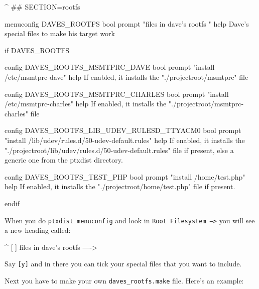 \begin{ptxshell}[escapechar=|]{^}
## SECTION=rootfs

menuconfig DAVES_ROOTFS
	bool
	prompt "files in dave's rootfs        "
	help
	  Dave's special files to make his target work

if DAVES_ROOTFS

config DAVES_ROOTFS_MSMTPRC_DAVE
	bool
	prompt "install /etc/msmtprc-dave"
	help
	  If enabled, it installs the "./projectroot/msmtprc" file

config DAVES_ROOTFS_MSMTPRC_CHARLES
	bool
	prompt "install /etc/msmtprc-charles"
	help
	  If enabled, it installs the "./projectroot/msmtprc-charles" file

config DAVES_ROOTFS_LIB_UDEV_RULESD_TTYACM0
	bool
	prompt "install /lib/udev/rules.d/50-udev-default.rules"
	help
	  If enabled, it installs the "./projectroot/lib/udev/rules.d/50-udev-default.rules"
	  file if present, else a generic one from the ptxdist directory.

config DAVES_ROOTFS_TEST_PHP
	bool
	prompt "install /home/test.php"
	help
	  If enabled, it installs the "./projectroot/home/test.php" file if present.

endif
\end{ptxshell}

When you do \texttt{ptxdist menuconfig} and look in \texttt{Root Filesystem --->}
you will see a new heading called:

\begin{ptxshell}[escapechar=|]{^}
 [ ] files in dave's rootfs ---->
\end{ptxshell}

Say \texttt{[y]} and in there you can tick your special files that you want
to include.

Next you have to make your own \texttt{daves\_rootfs.make} file. Here's an example:

